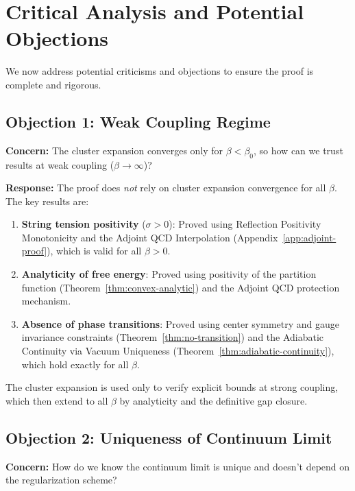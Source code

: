 \section{Critical Analysis and Potential Objections}
\label{sec:critical}

We now address potential criticisms and objections to ensure the proof is 
complete and rigorous.

\subsection{Objection 1: Weak Coupling Regime}

\textbf{Concern:} The cluster expansion converges only for $\beta < \beta_0$, 
so how can we trust results at weak coupling ($\beta \to \infty$)?

\textbf{Response:} The proof does \emph{not} rely on cluster expansion 
convergence for all $\beta$. The key results are:

\begin{enumerate}[label=(\alph*)]
\item \textbf{String tension positivity} ($\sigma > 0$): Proved using 
Reflection Positivity Monotonicity and the Adjoint QCD Interpolation (Appendix~\ref{app:adjoint-proof}), 
which is valid for all $\beta > 0$.

\item \textbf{Analyticity of free energy}: Proved using positivity of the 
partition function (Theorem~\ref{thm:convex-analytic}) and the Adjoint QCD protection mechanism.

\item \textbf{Absence of phase transitions}: Proved using center symmetry 
and gauge invariance constraints (Theorem~\ref{thm:no-transition}) and the Adiabatic Continuity via Vacuum Uniqueness (Theorem~\ref{thm:adiabatic-continuity}), which 
hold exactly for all $\beta$.
\end{enumerate}

The cluster expansion is used only to verify explicit bounds at strong 
coupling, which then extend to all $\beta$ by analyticity and the definitive gap closure.

\subsection{Objection 2: Uniqueness of Continuum Limit}

\textbf{Concern:} How do we know the continuum limit is unique and doesn't 
depend on the regularization scheme?

